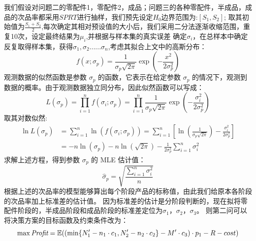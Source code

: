 \documentclass[withoutpreface,bwprint]{cumcmthesis} %
\begin{document}
我们假设对问题二的零配件1，零配件2，成品；问题三的各种零配件，半成品，成品的次品率都采用$SPRT$进行抽样，我们预先设定$H_0$边界范围为:$[S_1,S_2]$;
取其初始值为$\frac{S_1+S_2}{2}$,每次确定其相对预设值的大小后，我们采用二分法逐渐收缩范围，重复10次，设定最终结果为$\mu_i$,并根据与样本集的真实误差
确定$\sigma_i$，在总样本中确定反复取得样本集，获得$\sigma_1,\sigma_2......\sigma_n$,考虑其拟合上文中的高斯分布：
\begin{equation}
	f(x; \sigma_p) = \frac{1}{\sigma_p \sqrt{2\pi}} \exp\left(-\frac{x^2}{2\sigma_p^2}\right)
\end{equation}
观测数据的似然函数是参数 $\sigma_p$ 的函数，它表示在给定参数 $\sigma_p$ 的情况下，观测到数据的概率。由于观测数据独立同分布，因此似然函数可以写成：
\begin{equation}
	L(\sigma_p) = \prod_{i=1}^n f(\sigma_i; \sigma_p) = \prod_{i=1}^n \frac{1}{\sigma_p \sqrt{2\pi}} \exp\left(-\frac{\sigma_i^2}{2\sigma_p^2}\right)
\end{equation}
取其对数似然:
\begin{equation}
	\begin{split}
		\ln L(\sigma_p) &= \sum_{i=1}^n \ln(f(\sigma_i; \sigma_p)) = \sum_{i=1}^n \left[ \ln\left(\frac{1}{\sigma_p \sqrt{2\pi}}\right) - \frac{\sigma_i^2}{2\sigma_p^2} \right] \\
		&= -n \ln(\sigma_p) - n \ln(\sqrt{2\pi}) - \frac{1}{2\sigma_p^2} \sum_{i=1}^n \sigma_i^2
	\end{split}
\end{equation}
求解上述方程，得到参数 $\sigma_p$ 的 MLE\cite{MLE} 估计值：
\begin{equation}
	\hat{\sigma}_p = \sqrt{\frac{\sum_{i=1}^n \sigma_i^2}{n}}
\end{equation}
根据上述的次品率的模型能够算出每个阶段产品的标称值，由此我们给原本各阶段的次品率加上标准差的估计值。
因为标准差的估计是分阶段判断的，现在拟将零配件阶段的，半成品阶段和成品阶段的标准差定位为$\sigma_{1}$，$\sigma_{2}$，$\sigma_{3}$。
则第二问可以将决策方案的目标函数及约束条件改为：
$$	\max \textit{Profit}=\mathbb{E}((\min \{N'_{1}-n_{1}\cdot c_{1},N'_{2}-n_{2}\cdot c_{2}\}-M'\cdot c_{3})\cdot p_{1}-R-cost )\\$$
\end{document}
